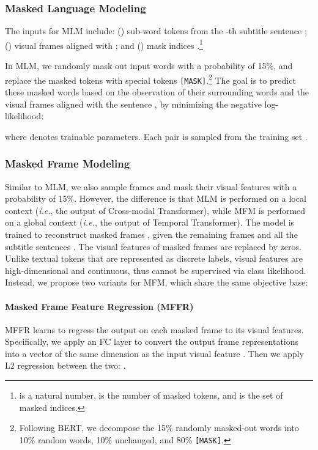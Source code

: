 \documentclass[11pt,a4paper]{article}
\begin{document}
\vspace{5pt}
\subsubsection{Masked Language Modeling}\label{sec:mlm}
The inputs for MLM include: () sub-word tokens from the -th subtitle sentence ; () visual frames  aligned with ; and () mask indices .\footnote{ is a natural number,  is the number of masked tokens, and  is the set of masked indices.}

In MLM, we randomly mask out input words with a probability of 15\%, and replace the masked tokens  with special tokens \texttt{[MASK]}.\footnote{Following BERT, we decompose the 15\% randomly masked-out words into 10\% random words, 10\% unchanged, and 80\% \texttt{[MASK]}.}
The goal is to predict these masked words based on the observation of their surrounding words  and the visual frames aligned with the sentence , by minimizing the negative log-likelihood:

where  denotes trainable parameters. 
Each pair  is sampled from the training set .

\vspace{5pt}
\subsubsection{Masked Frame Modeling} 
Similar to MLM, we also sample frames and mask their visual features with a probability of 15\%. However, the difference is that MLM is performed on a local context (\emph{i.e.}, the output of Cross-modal Transformer), while MFM is performed on a global context (\emph{i.e.}, the output of Temporal Transformer). 
The model is trained to reconstruct masked frames , given the remaining frames  and all the subtitle sentences . 
The visual features of masked frames are replaced by zeros.
Unlike textual tokens that are represented as discrete labels, visual features are high-dimensional and continuous, thus cannot be supervised via class likelihood.
Instead, we propose two variants for MFM, which share the same objective base:


\paragraph{Masked Frame Feature Regression (MFFR)}
MFFR learns to regress the output on each masked frame  to its visual features. Specifically, we apply an FC layer to convert the output frame representations into a vector  of the same dimension as the input visual feature .
Then we apply L2 regression between the two: . 
\end{document}
